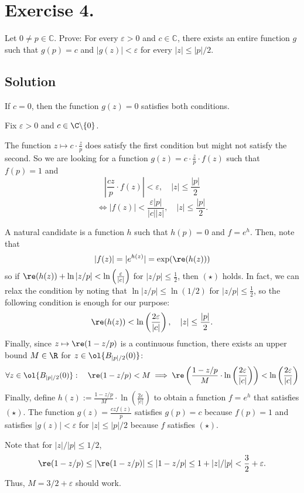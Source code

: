 
\section{Exercise 4.}

Let \( 0 \neq p \in \mathbb{C} \). Prove: For every \( \varepsilon > 0 \) and \( c \in \mathbb{C} \), there exists an entire function \( g \) such that \( g(p) = c \) and $|g(z)| < \varepsilon$ for every $|z| \leq |p|/2$.

\subsection*{Solution}

If $c = 0$, then the function $g(z) = 0$ satisfies both conditions.

Fix $\varepsilon > 0$ and $c\in \C\backslash \{0\}$.

The function $z\mapsto c \cdot \frac{z}{p}$ does satisfy the first condition but might not satisfy the second. So we are looking for a function $g(z) = c \cdot \frac{z}{p} \cdot f(z)$ such that $f(p) = 1$ and
\[ \left| \frac{cz}{p} \cdot f(z) \right| < \varepsilon ,\quad |z| \leq \frac{|p|}{2} \]
\[ \iff |f(z)| < \frac{\varepsilon|p|}{|c||z|},\quad |z| \leq \frac{|p|}{2}. \tag{$\star$} \]

A natural candidate is a function $h$ such that $h(p) = 0$ and $f = e^h$. Then, note that
\[ |f(z)| = |e^{h(z)}| = \exp(\re(h(z)))  \]
so if $\re(h(z)) + \ln|z/p| < \ln\left( \frac{\varepsilon}{|c|} \right) $ for $|z/p| \leq \frac{1}{2}$, then $(\star)$ holds. In fact, we can relax the condition by noting that $\ln|z/p| \leq \ln(1/2)$ for $|z/p| \leq \frac{1}{2}$, so the following condition is enough for our purpose:
\[ \re(h(z)) <  \ln\left( \frac{2\varepsilon}{|c|}\right),\quad |z| \leq \frac{|p|}{2}.\]
Finally, since $z \mapsto \re(1-z/p)$ is a continuous function, there exists an upper bound $M \in \R$ for $z \in \ol{B_{|p|/2}(0)}$:
\[ \forall z \in \ol{B_{|p|/2}(0)}: \quad \re(1-z/p) < M \implies \re\left( \frac{1-z/p}{M} \cdot \ln\left( \frac{2\varepsilon}{|c|}\right) \right) < \ln\left( \frac{2\varepsilon}{|c|}\right) \]
Finally, define $h(z) :=  \frac{1-z/p}{M} \cdot \ln\left( \frac{2\varepsilon}{|c|}\right)$ to obtain a function $f = e^h$ that satisfies $(\star)$. The function $g(z) = \frac{czf(z)}{p}$ satisfies $g(p) = c$ because $f(p) = 1$ and satisfies $|g(z)| < \varepsilon$ for $|z| \leq |p|/2$ because $f$ satisfies $(\star)$.

Note that for $|z|/|p| \leq 1/2$,
\[ \re(1-z/p) \leq |\re(1-z/p)| \leq |1- z/p| \leq 1 + |z|/|p| < \frac{3}{2}+\varepsilon. \]
Thus, $M = 3/2 + \varepsilon$ should work.